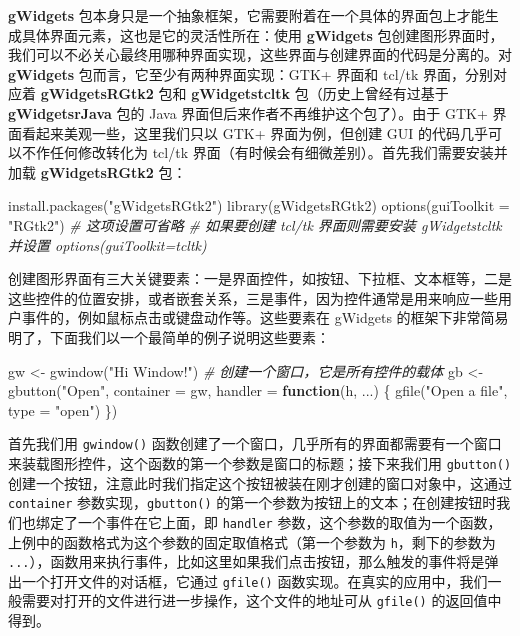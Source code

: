 \documentclass[
  b5paper,
  UTF8,twoside]{book}
\newenvironment{Shaded}{\begin{snugshade}}{\end{snugshade}}
\newcommand{\AttributeTok}[1]{\textcolor[rgb]{0.77,0.63,0.00}{#1}}
\newcommand{\CommentTok}[1]{\textcolor[rgb]{0.56,0.35,0.01}{\textit{#1}}}
\newcommand{\ControlFlowTok}[1]{\textcolor[rgb]{0.13,0.29,0.53}{\textbf{#1}}}
\newcommand{\FunctionTok}[1]{\textcolor[rgb]{0.00,0.00,0.00}{#1}}
\newcommand{\NormalTok}[1]{#1}
\newcommand{\OtherTok}[1]{\textcolor[rgb]{0.56,0.35,0.01}{#1}}
\newcommand{\StringTok}[1]{\textcolor[rgb]{0.31,0.60,0.02}{#1}}
\begin{document}
\textbf{gWidgets} 包本身只是一个抽象框架，它需要附着在一个具体的界面包上才能生成具体界面元素，这也是它的灵活性所在：使用 \textbf{gWidgets} 包创建图形界面时，我们可以不必关心最终用哪种界面实现，这些界面与创建界面的代码是分离的。对 \textbf{gWidgets} 包而言，它至少有两种界面实现：GTK+ 界面和 tcl/tk 界面，分别对应着 \textbf{gWidgetsRGtk2} 包和 \textbf{gWidgetstcltk} 包（历史上曾经有过基于 \textbf{gWidgetsrJava} 包的 Java 界面但后来作者不再维护这个包了）。由于 GTK+ 界面看起来美观一些，这里我们只以 GTK+ 界面为例，但创建 GUI 的代码几乎可以不作任何修改转化为 tcl/tk 界面（有时候会有细微差别）。首先我们需要安装并加载 \textbf{gWidgetsRGtk2} 包：

\begin{Shaded}
\begin{Highlighting}[]
\FunctionTok{install.packages}\NormalTok{(}\StringTok{"gWidgetsRGtk2"}\NormalTok{)}
\FunctionTok{library}\NormalTok{(gWidgetsRGtk2)}
\FunctionTok{options}\NormalTok{(}\AttributeTok{guiToolkit =} \StringTok{"RGtk2"}\NormalTok{) }\CommentTok{\# 这项设置可省略}
\CommentTok{\# 如果要创建 tcl/tk 界面则需要安装 gWidgetstcltk 并设置 options(guiToolkit=\textquotesingle{}tcltk\textquotesingle{})}
\end{Highlighting}
\end{Shaded}

创建图形界面有三大关键要素：一是界面控件，如按钮、下拉框、文本框等，二是这些控件的位置安排，或者嵌套关系，三是事件，因为控件通常是用来响应一些用户事件的，例如鼠标点击或键盘动作等。这些要素在 gWidgets 的框架下非常简易明了，下面我们以一个最简单的例子说明这些要素：

\begin{Shaded}
\begin{Highlighting}[]
\NormalTok{gw }\OtherTok{\textless{}{-}} \FunctionTok{gwindow}\NormalTok{(}\StringTok{"Hi Window!"}\NormalTok{) }\CommentTok{\# 创建一个窗口，它是所有控件的载体}
\NormalTok{gb }\OtherTok{\textless{}{-}} \FunctionTok{gbutton}\NormalTok{(}\StringTok{"Open"}\NormalTok{, }\AttributeTok{container =}\NormalTok{ gw, }\AttributeTok{handler =} \ControlFlowTok{function}\NormalTok{(h, ...) \{}
  \FunctionTok{gfile}\NormalTok{(}\StringTok{"Open a file"}\NormalTok{, }\AttributeTok{type =} \StringTok{"open"}\NormalTok{)}
\NormalTok{\})}
\end{Highlighting}
\end{Shaded}

首先我们用 \texttt{gwindow()} 函数创建了一个窗口，几乎所有的界面都需要有一个窗口来装载图形控件，这个函数的第一个参数是窗口的标题；接下来我们用 \texttt{gbutton()} 创建一个按钮，注意此时我们指定这个按钮被装在刚才创建的窗口对象中，这通过 \texttt{container} 参数实现，\texttt{gbutton()} 的第一个参数为按钮上的文本；在创建按钮时我们也绑定了一个事件在它上面，即 \texttt{handler} 参数，这个参数的取值为一个函数，上例中的函数格式为这个参数的固定取值格式（第一个参数为 \texttt{h}，剩下的参数为 \texttt{...}），函数用来执行事件，比如这里如果我们点击按钮，那么触发的事件将是弹出一个打开文件的对话框，它通过 \texttt{gfile()} 函数实现。在真实的应用中，我们一般需要对打开的文件进行进一步操作，这个文件的地址可从 \texttt{gfile()} 的返回值中得到。
\end{document}
